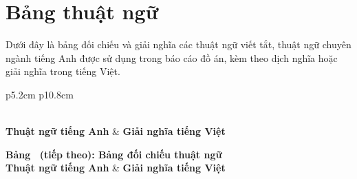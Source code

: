 {}
\section*{Bảng thuật ngữ}

Dưới đây là bảng đối chiếu và giải nghĩa các thuật ngữ viết tắt, thuật ngữ chuyên ngành tiếng Anh được sử dụng trong báo cáo đồ án, kèm theo dịch nghĩa hoặc giải nghĩa trong tiếng Việt.

\begin{longtable}{p{5.2cm} p{10.8cm}}
    \caption{Bảng đối chiếu thuật ngữ Anh - Việt và chuyên ngành} \label{tab:bang-thuat-ngu} \\
    \toprule
    \textbf{Thuật ngữ tiếng Anh} & \textbf{Giải nghĩa tiếng Việt} \\
    \midrule
    \endfirsthead
    
    {{\bfseries Bảng \thetable\ (tiếp theo): Bảng đối chiếu thuật ngữ}} \\
    \toprule
    \textbf{Thuật ngữ tiếng Anh} & \textbf{Giải nghĩa tiếng Việt} \\
    \midrule
    \endhead
    
    \bottomrule
    \endfoot
    
    \bottomrule
    \endlastfoot
    

\end{longtable}
